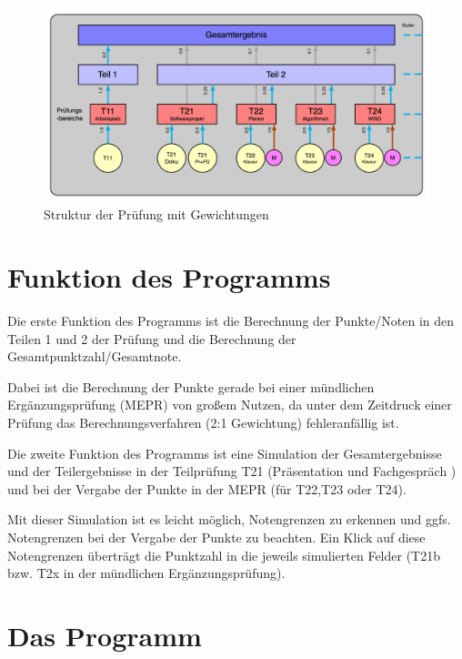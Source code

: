 \documentclass[a4paper,notitlepage,parskip=half]{scrartcl}
\begin{document}
\begin{figure}[ht]
    \centering
\includegraphics[width=15cm]{FIGrafik.png}
    \caption{Struktur der Prüfung mit Gewichtungen}
    \label{fig:berechnung}
\end{figure}

\section{Funktion des Programms}
Die erste Funktion des Programms ist die Berechnung der Punkte/Noten in den Teilen 1 und 2 der Prüfung und die Berechnung der Gesamtpunktzahl/Gesamtnote.

Dabei ist die Berechnung der Punkte gerade bei einer mündlichen Ergänzungsprüfung (MEPR) von großem Nutzen, da unter dem Zeitdruck einer Prüfung  das Berechnungsverfahren (2:1 Gewichtung) fehleranfällig ist.

Die zweite Funktion des Programms ist eine Simulation der Gesamtergebnisse und der Teilergebnisse in der Teilprüfung T21 (Präsentation und Fachgespräch )  und bei der Vergabe der Punkte in der MEPR (für T22,T23 oder T24).

Mit dieser Simulation ist es leicht möglich, Notengrenzen zu erkennen und ggfs. Notengrenzen bei der Vergabe der Punkte zu beachten. Ein Klick auf diese Notengrenzen überträgt die Punktzahl in die jeweils simulierten Felder (T21b bzw. T2x in der mündlichen Ergänzungsprüfung).

\section{Das Programm}
\end{document}
